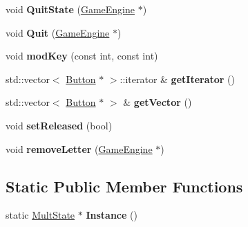 \begin{DoxyCompactItemize}
\item 
\hypertarget{class_mult_state_a014f57040189ee13edbc056122cdaa92}{}void {\bfseries Quit\+State} (\hyperlink{class_game_engine}{Game\+Engine} $\ast$)\label{class_mult_state_a014f57040189ee13edbc056122cdaa92}

\item 
\hypertarget{class_mult_state_a4751a12073b185555d2011f24efd025a}{}void {\bfseries Quit} (\hyperlink{class_game_engine}{Game\+Engine} $\ast$)\label{class_mult_state_a4751a12073b185555d2011f24efd025a}

\item 
\hypertarget{class_mult_state_a2fa3c6bed692c60a359a3b79c7d2f484}{}void {\bfseries mod\+Key} (const int, const int)\label{class_mult_state_a2fa3c6bed692c60a359a3b79c7d2f484}

\item 
\hypertarget{class_mult_state_a383c1082c09106fb15e661f4c04ebaec}{}std\+::vector$<$ \hyperlink{class_button}{Button} $\ast$ $>$\+::iterator \& {\bfseries get\+Iterator} ()\label{class_mult_state_a383c1082c09106fb15e661f4c04ebaec}

\item 
\hypertarget{class_mult_state_aab6ed6a4dd80f1a2b9afeb0f1f5b7bd8}{}std\+::vector$<$ \hyperlink{class_button}{Button} $\ast$ $>$ \& {\bfseries get\+Vector} ()\label{class_mult_state_aab6ed6a4dd80f1a2b9afeb0f1f5b7bd8}

\item 
\hypertarget{class_mult_state_ac2b5aeea8b498cbe5a86b1ffa6730a1a}{}void {\bfseries set\+Released} (bool)\label{class_mult_state_ac2b5aeea8b498cbe5a86b1ffa6730a1a}

\item 
\hypertarget{class_mult_state_a7d5ff44182124ae655a49ed330a292ca}{}void {\bfseries remove\+Letter} (\hyperlink{class_game_engine}{Game\+Engine} $\ast$)\label{class_mult_state_a7d5ff44182124ae655a49ed330a292ca}

\end{DoxyCompactItemize}
\subsection*{Static Public Member Functions}
\begin{DoxyCompactItemize}
\item 
\hypertarget{class_mult_state_a1e851900111d00ce1df5eb5639234aed}{}static \hyperlink{class_mult_state}{Mult\+State} $\ast$ {\bfseries Instance} ()\label{class_mult_state_a1e851900111d00ce1df5eb5639234aed}

\end{DoxyCompactItemize}
